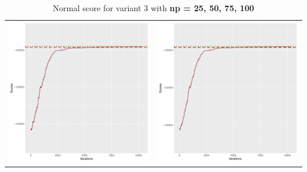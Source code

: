 \documentclass[]{scrartcl}
\begin{document}
\begin{table}[h!]
\begin{tabular}{cc}
\includegraphics[scale = 0.4]{./figs/hepar2/v3/75/boundsEvolution-10352.pdf} & 
\includegraphics[scale = 0.4]{./figs/hepar2/v3/100/boundsEvolution-10352.pdf} \\
\end{tabular}
\caption{Normal score for variant 3 with \textbf{np =  25, 50, 75, 100}}
\end{table}
\end{document}
